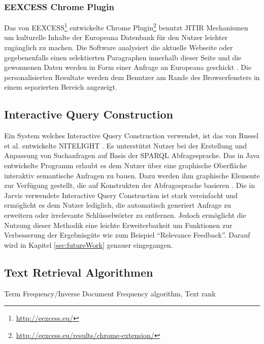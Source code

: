  	\subsubsection{EEXCESS Chrome Plugin}
 	Das von EEXCESS\footnote{\url{http://eexcess.eu/}} entwickelte Chrome Plugin\footnote{\url{http://eexcess.eu/results/chrome-extension/}} benutzt JITIR Mechanismen um kulturelle Inhalte der Europeana Datenbank für den Nutzer leichter zugänglich zu machen. Die Software analysiert die aktuelle Webseite oder gegebenenfalls einen selektierten Paragraphen innerhalb dieser Seite und die gewonnenen Daten werden in Form einer Anfrage an Europeana geschickt \cite{schlottererweb}. Die personalisierten Resultate werden dem Benutzer am Rande des Browserfensters in einem separierten Bereich angezeigt.

\subsection{Interactive Query Construction}
Ein System welches Interactive Query Construction verwendet, ist das von Russel et al. entwickelte NITELIGHT \cite{russell2008nitelight}. Es unterstützt Nutzer bei der Erstellung und Anpassung von Suchanfragen auf Basis der SPARQL \cite{sparql} Abfragesprache. Das in Java entwickelte Programm erlaubt es dem Nutzer über eine graphische Oberfläche interaktiv semantische Anfragen zu bauen. Dazu werden ihm graphische Elemente zur Verfügung gestellt, die auf Konstrukten der Abfragesprache basieren \cite{russell2008nitelight}. Die in Jarvis verwendete Interactive Query Construction ist stark vereinfacht und ermöglicht es dem Nutzer lediglich, die automatisch generiert Anfrage zu erweitern oder irrelevante Schlüsselwörter zu entfernen. Jedoch ermöglicht die Nutzung dieser Methodik eine leichte Erweiterbarkeit um Funktionen zur Verbesserung der Ergebnisgüte wie zum Beispiel ``Relevance Feedback''. Darauf wird in Kapitel \ref{sec:futureWork} genauer eingegangen. 

\subsection{Text Retrieval Algorithmen}
 		Term Frequency/Inverse Document Frequency algorithm,
 		Text rank